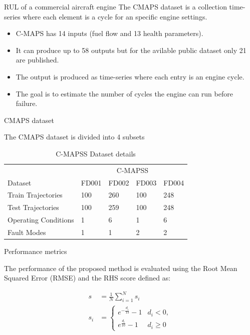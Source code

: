 \documentclass{beamer}
\begin{document}
\begin{darkframes}
\begin{frame}{RUL of a commercial aircraft engine}
      The CMAPS dataset is a collection time-series where each element is a cycle for an specific engine settings.
      
      \begin{itemize}
      \item C-MAPS has 14 inputs (fuel flow and 13 health parameters).
      \item It can produce up to 58  outputs but for the avilable public dataset only 21 are published.
      \item The output is produced as time-series where each entry is an engine cycle.
      \item The goal is to estimate the number of cycles the engine can run before failure.
      \end{itemize}
      
    \end{frame}
    
     \begin{frame}{CMAPS dataset}
      
      The CMAPS dataset is divided into 4 subsets
      
	\begin{table}[!htb]
	\centering
		\begin{tabular}{l | l l l l}
			\hline
		 	& \multicolumn{4}{c}{C-MAPSS}\\  
	 		Dataset & FD001 & FD002 & FD003 & FD004\\
  			\hline
  			Train Trajectories & 100 & 260 & 100 & 248\\
  			Test Trajectories & 100 & 259 & 100 & 248\\
  			Operating Conditions & 1 & 6 & 1 & 6\\
  			Fault Modes & 1 & 1 & 2 & 2\\
  			\hline
		\end{tabular}
	\caption{C-MAPSS Dataset details}
	\label{table:cmapss}
	\end{table}
      
    \end{frame}
    
    \begin{frame}{Performance metrics}
      
      The performance of the proposed method is evaluated using the Root Mean Squared Error (RMSE) and the RHS score defined as:

	\begin{align}
	s &= \frac{1}{N} \sum_{i=1}^{N}{s_i} \nonumber \\
	s_i &= \begin{cases} 
      e^{-\frac{d_i}{13}} - 1 & d_i < 0, \\
      e^{\frac{d_i}{10}} - 1 & d_i \geq 0
	\end{cases}
	\label{eq:rhs}
	\end{align}
      

\end{frame}
\end{darkframes}
\end{document}
